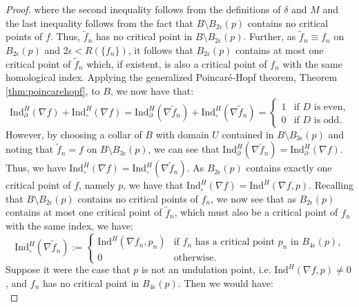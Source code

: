\documentclass[11pt]{article}
\newcommand{\1}{\mathbf{1}}
\theoremstyle{definition}
\theoremstyle{remark}
\begin{document}
\begin{proof}
\noindent where the second inequality follows from the definitions of $\delta$ and $M$ and the last inequality follows from the fact that $B\setminus B_{2\epsilon}(p)$ contains no critical points of $f$. Thus, $\tilde{f}_n$ has no critical point in $B\setminus B_{2\epsilon}(p)$. Further, as $\tilde{f}_n\equiv f_n$ on $B_{2\epsilon}(p)$ and $2\epsilon < R(\{ f_n\})$, it follows that $B_{2\epsilon}(p)$ contains at most one critical point of $\tilde{f}_n$ which, if existent, is also a critical point of $f_n$ with the same homological index. Applying the generalized Poincar\'{e}-Hopf theorem, Theorem \ref{thm:poincarehopf}, to $B$, we now have that:
\begin{equation}\nonumber
    \text{Ind}^H_\partial(\nabla f) + \text{Ind}^H_\circ(\nabla f) = \text{Ind}^H_\partial(\nabla \tilde{f}_n) + \text{Ind}^H_\circ(\nabla \tilde{f}_n) = \begin{cases}
    1 & \text{if }D \text{ is even,}\\
    0 & \text{if }D \text{ is odd.}
    \end{cases}
\end{equation}
However, by choosing a collar of $B$ with domain $U$ contained in $\overline{B\setminus B_{3\epsilon}(p)}$ and noting that $\tilde{f}_n= f$ on $B\setminus B_{3\epsilon}(p)$, we can see that $\text{Ind}^H_\partial(\nabla \tilde{f}_n)=\text{Ind}^H_\partial(\nabla f)$. Thus, we have $\text{Ind}^H_\circ(\nabla f) = \text{Ind}^H_\circ(\nabla \tilde{f}_n)$.
As $B_{2\epsilon}(p)$ contains exactly one critical point of $f$, namely $p$, we have that $\text{Ind}^H_\circ(\nabla f)=\text{Ind}^H(\nabla f, p)$. Recalling that $B\setminus B_{2\epsilon}(p)$ contains no critical points of $f_n$, we now see that as $B_{2\epsilon}(p)$ contains at most one critical point of $\tilde{f}_n$, which must also be a critical point of $f_n$ with the same index, we have:
\begin{equation}\nonumber
    \text{Ind}^H_\circ(\nabla \tilde{f}_n) := \begin{cases}
        \text{Ind}^H(\nabla f_n, p_n) & \text{if $f_n$ has a critical point $p_n$ in $B_{4\epsilon}(p)$,} \\
        0 & \text{otherwise}.
    \end{cases}
\end{equation}
Suppose it were the case that $p$ is not an undulation point, i.e. $\text{Ind}^H(\nabla f, p)\neq 0$, and $f_n$ has no critical point in $B_{4\epsilon}(p)$. Then we would have:
\begin{equation}\label{eq:hom_index_equality}

\end{equation}
\end{proof}
\end{document}
